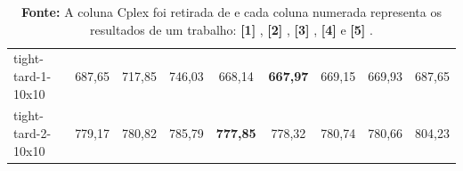 \begin{table}
{\begin{tabular}{lcccccccc}
tight-tard-1-10x10  & 687,65          & 717,85          & 746,03          & 668,14          & \textbf{667,97} & 669,15             & 669,93                & 687,65                  \\
tight-tard-2-10x10  & 779,17          & 780,82          & 785,79          & \textbf{777,85} & 778,32          & 780,74             & 780,66                & 804,23                  \\
\hline
\end{tabular}
}
\caption*{\small \textbf{Fonte:} A coluna Cplex foi retirada de \cite{ahmadian2021meta} e cada coluna numerada representa os resultados de um trabalho: \textbf{[1]} \cite{dos2010combination}, \textbf{[2]} \cite{wang2014variable}, \textbf{[3]} \cite{ahmadian2021meta}, \textbf{[4]} \cite{abderrazzak2022adaptive} e \textbf{[5]} \cite{sabri2023reinforcement}.}
\end{table}


